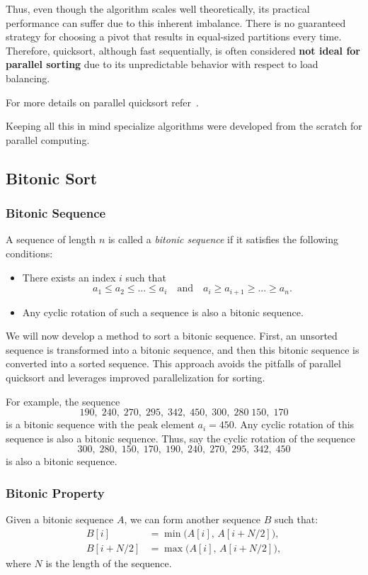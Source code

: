 \documentclass[12pt]{book}
\begin{document}
Thus, even though the algorithm scales well theoretically, its practical performance can suffer due to this inherent imbalance. There is no guaranteed strategy for choosing a pivot that results in equal-sized partitions every time. Therefore, quicksort, although fast sequentially, is often considered \textbf{not ideal for parallel sorting} due to its unpredictable behavior with respect to load balancing.

For more details on parallel quicksort refer~\cite{kumar1994introduction}.

Keeping all this in mind specialize algorithms were developed from the scratch for parallel computing.


\subsection{Bitonic Sort}

\subsubsection{Bitonic Sequence}
A sequence of length $n$ is called a \emph{bitonic sequence} if it satisfies the following conditions:
\begin{itemize}
    \item There exists an index $i$ such that
    \[
    a_1 \leq a_2 \leq \ldots \leq a_i \quad \text{and} \quad a_i \geq a_{i+1} \geq \ldots \geq a_n.
    \]
    \item Any cyclic rotation of such a sequence is also a bitonic sequence.
\end{itemize}

We will now develop a method to sort a bitonic sequence. First, an unsorted sequence is transformed into a bitonic sequence, and then this bitonic sequence is converted into a sorted sequence. This approach avoids the pitfalls of parallel quicksort and leverages improved parallelization for sorting.

For example, the sequence
\[
190,\;240,\;270,\;295,\;342,\;450,\;300,\;280\;150,\;170
\]
is a bitonic sequence with the peak element $a_i = 450$. Any cyclic rotation of this sequence is also a bitonic sequence. Thus, say the cyclic rotation of the sequence
\[
300,\;280,\;150,\;170,\;190,\;240,\;270,\;295,\;342,\;450
\]
is also a bitonic sequence.

\subsubsection{Bitonic Property}
Given a bitonic sequence $A$, we can form another sequence $B$ such that:
\begin{align*}
    B[i] &= \min\big(A[i],\, A[i+N/2]\big), \\
    B[i+N/2] &= \max\big(A[i],\, A[i+N/2]\big),
\end{align*}
where $N$ is the length of the sequence.
\end{document}
